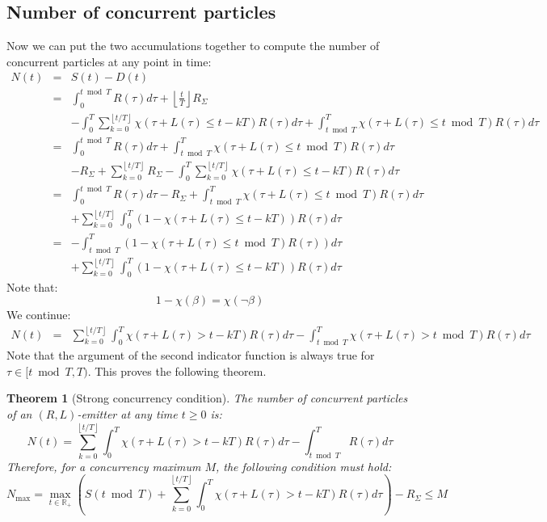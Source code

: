 \documentclass[10pt]{report}
\newcommand{\floor}[1]{\left\lfloor #1 \right\rfloor}
\newtheorem{theorem}{Theorem}
\newenvironment{thm}
	{\begin{shaded}\begin{theorem}}
	{\end{theorem}\end{shaded}}
\begin{document}
\subsection{Number of concurrent particles}
Now we can put the two accumulations together to compute the number of concurrent particles at any point in time:
\begin{eqnarray}
N(t)&=&S(t)-D(t)\\
&=&\int_0^{t\bmod T}R(\tau)d\tau+\floor{\tfrac{t}{T}}R_\Sigma\nonumber\\&&-\int_0^T\sum_{k=0}^{\floor{t/T}}\chi(\tau+L(\tau)\leq t-kT)R(\tau)d\tau+\int_{t\bmod T}^T\chi(\tau+L(\tau)\leq t\bmod T)R(\tau)d\tau\\
&=&\int_0^{t\bmod T}R(\tau)d\tau+\int_{t\bmod T}^T\chi(\tau+L(\tau)\leq t\bmod T)R(\tau)d\tau\nonumber\\&&-R_\Sigma+\sum_{k=0}^{\floor{t/T}}R_\Sigma-\int_0^T\sum_{k=0}^{\floor{t/T}}\chi(\tau+L(\tau)\leq t-kT)R(\tau)d\tau\\
&=&\int_0^{t\bmod T}R(\tau)d\tau-R_\Sigma+\int_{t\bmod T}^T\chi(\tau+L(\tau)\leq t\bmod T)R(\tau)d\tau\nonumber\\&&+\sum_{k=0}^{\floor{t/T}}\int_0^T(1-\chi(\tau+L(\tau)\leq t-kT))R(\tau)d\tau\\
&=&-\int_{t\bmod T}^T(1-\chi(\tau+L(\tau)\leq t\bmod T)R(\tau))d\tau\nonumber\\&&+\sum_{k=0}^{\floor{t/T}}\int_0^T(1-\chi(\tau+L(\tau)\leq t-kT))R(\tau)d\tau
\end{eqnarray}
Note that:
\begin{equation}1-\chi(\beta)=\chi(\neg\beta)\end{equation}
We continue:
\begin{eqnarray}
N(t)&=&\sum_{k=0}^{\floor{t/T}}\int_0^T\chi(\tau+L(\tau)>t-kT)R(\tau)d\tau-\int_{t\bmod T}^T\chi(\tau+L(\tau)>t\bmod T)R(\tau)d\tau
\end{eqnarray}
Note that the argument of the second indicator function is always true for $\tau\in[t\bmod T,T)$. This proves the following theorem.

\begin{thm}[Strong concurrency condition]
The number of concurrent particles of an $(R,L)$-emitter at any time $t\geq0$ is:
\begin{equation}\boxed{N(t)=\sum_{k=0}^{\floor{t/T}}\int_0^T\chi(\tau+L(\tau)>t-kT)R(\tau)d\tau-\int_{t\bmod T}^TR(\tau)d\tau}\end{equation}
Therefore, for a concurrency maximum $M$, the following condition must hold:
\begin{equation}\boxed{N_{\max}=\max_{t\in\mathbb{R}_+}\left(S(t\bmod T)+\sum_{k=0}^{\floor{t/T}}\int_0^T\chi(\tau+L(\tau)>t-kT)R(\tau)d\tau\right)-R_\Sigma\leq M}\end{equation}
\end{thm}
\end{document}
